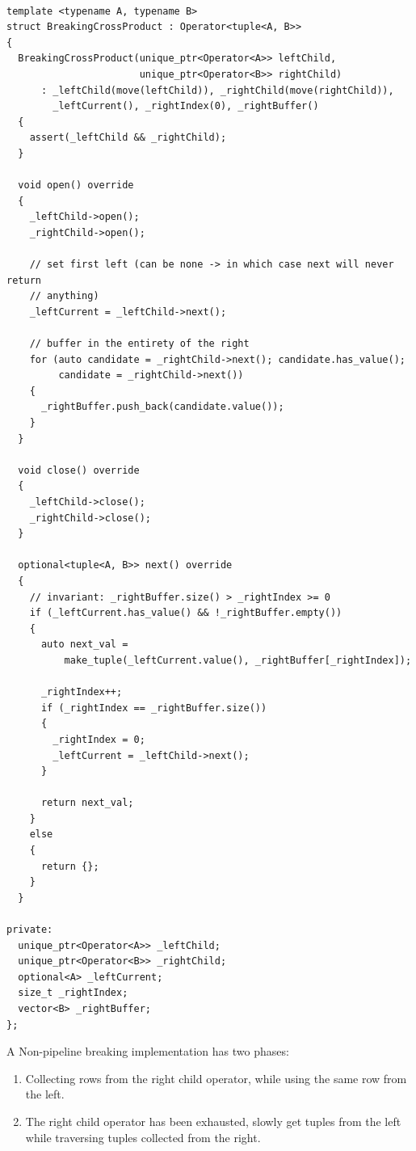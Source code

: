 \begin{verbatim}

template <typename A, typename B>
struct BreakingCrossProduct : Operator<tuple<A, B>>
{
  BreakingCrossProduct(unique_ptr<Operator<A>> leftChild,
                       unique_ptr<Operator<B>> rightChild)
      : _leftChild(move(leftChild)), _rightChild(move(rightChild)),
        _leftCurrent(), _rightIndex(0), _rightBuffer()
  {
    assert(_leftChild && _rightChild);
  }

  void open() override
  {
    _leftChild->open();
    _rightChild->open();

    // set first left (can be none -> in which case next will never return
    // anything)
    _leftCurrent = _leftChild->next();

    // buffer in the entirety of the right
    for (auto candidate = _rightChild->next(); candidate.has_value();
         candidate = _rightChild->next())
    {
      _rightBuffer.push_back(candidate.value());
    }
  }

  void close() override
  {
    _leftChild->close();
    _rightChild->close();
  }

  optional<tuple<A, B>> next() override
  {
    // invariant: _rightBuffer.size() > _rightIndex >= 0
    if (_leftCurrent.has_value() && !_rightBuffer.empty())
    {
      auto next_val =
          make_tuple(_leftCurrent.value(), _rightBuffer[_rightIndex]);

      _rightIndex++;
      if (_rightIndex == _rightBuffer.size())
      {
        _rightIndex = 0;
        _leftCurrent = _leftChild->next();
      }

      return next_val;
    }
    else
    {
      return {};
    }
  }

private:
  unique_ptr<Operator<A>> _leftChild;
  unique_ptr<Operator<B>> _rightChild;
  optional<A> _leftCurrent;
  size_t _rightIndex;
  vector<B> _rightBuffer;
};
\end{verbatim}
A Non-pipeline breaking implementation has two phases:
\begin{enumerate}
  \item Collecting rows from the right child operator, while using the same row from the left.
  \item The right child operator has been exhausted, slowly get tuples from the left while traversing tuples collected from the right.
\end{enumerate}
